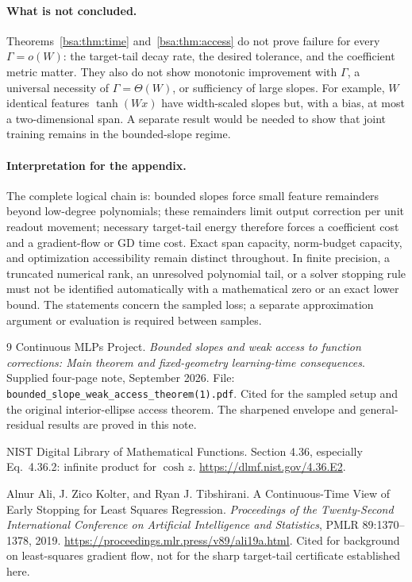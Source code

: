 \documentclass[11pt,letterpaper]{article}
\theoremstyle{remark}
\theoremstyle{plain}
\begin{document}
\paragraph{What is not concluded.}
Theorems~\ref{bsa:thm:time} and~\ref{bsa:thm:access} do not prove failure for every $\Gamma=o(W)$: the target-tail decay rate, the desired tolerance, and the coefficient metric matter. They also do not show monotonic improvement with $\Gamma$, a universal necessity of $\Gamma=\Theta(W)$, or sufficiency of large slopes. For example, $W$ identical features $\tanh(Wx)$ have width-scaled slopes but, with a bias, at most a two-dimensional span. A separate result would be needed to show that joint training remains in the bounded-slope regime.

\paragraph{Interpretation for the appendix.}
The complete logical chain is: bounded slopes force small feature remainders beyond low-degree polynomials; these remainders limit output correction per unit readout movement; necessary target-tail energy therefore forces a coefficient cost and a gradient-flow or GD time cost. Exact span capacity, norm-budget capacity, and optimization accessibility remain distinct throughout. In finite precision, a truncated numerical rank, an unresolved polynomial tail, or a solver stopping rule must not be identified automatically with a mathematical zero or an exact lower bound. The statements concern the sampled loss; a separate approximation argument or evaluation is required between samples.

\begin{thebibliography}{9}
Continuous MLPs Project.
\emph{Bounded slopes and weak access to function corrections: Main theorem and fixed-geometry learning-time consequences}.
Supplied four-page note, September 2026.
File: \texttt{bounded\_slope\_weak\_access\_theorem(1).pdf}.
Cited for the sampled setup and the original interior-ellipse access theorem. The sharpened envelope and general-residual results are proved in this note.

NIST Digital Library of Mathematical Functions.
Section 4.36, especially Eq.~4.36.2: infinite product for $\cosh z$.
\url{https://dlmf.nist.gov/4.36.E2}.

Alnur Ali, J. Zico Kolter, and Ryan J. Tibshirani.
A Continuous-Time View of Early Stopping for Least Squares Regression.
\emph{Proceedings of the Twenty-Second International Conference on Artificial Intelligence and Statistics},
PMLR 89:1370--1378, 2019.
\url{https://proceedings.mlr.press/v89/ali19a.html}.
Cited for background on least-squares gradient flow, not for the sharp target-tail certificate established here.
\end{thebibliography}

\end{document}
